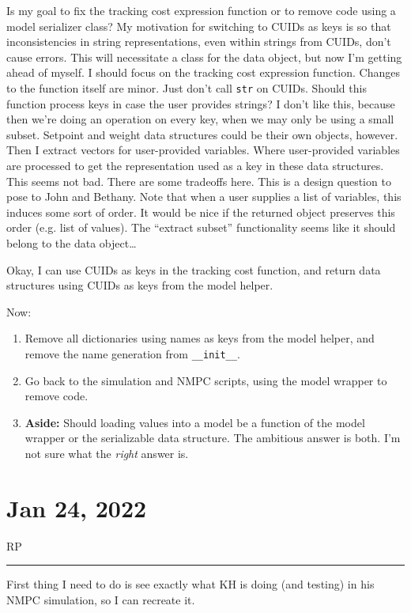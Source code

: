 \documentclass{article}
\newcommand{\RP}{\vspace{0.5cm}RP\vspace{0.2cm}\hrule\vspace{0.2cm}}
\begin{document}
\medskip

Is my goal to fix the tracking cost expression function or to remove code using
a model serializer class?
My motivation for switching to CUIDs as keys is so that inconsistencies in
string representations, even within strings from CUIDs, don't cause errors.
This will necessitate a class for the data object, but now I'm getting ahead
of myself.
I should focus on the tracking cost expression function.
Changes to the function itself are minor. Just don't call \texttt{str} on CUIDs.
Should this function process keys in case the user provides strings?
I don't like this, because then we're doing an operation on every key, when
we may only be using a small subset.
Setpoint and weight data structures could be their own objects, however. Then
I extract vectors for user-provided variables. Where user-provided variables
are processed to get the representation used as a key in these data structures.
This seems not bad. There are some tradeoffs here. This is a design question to
pose to John and Bethany.
Note that when a user supplies a list of variables, this induces some sort of
order. It would be nice if the returned object preserves this order (e.g. list
of values).
The ``extract subset'' functionality seems like it should belong to the data
object\ldots

\medskip

Okay, I can use CUIDs as keys in the tracking cost function, and return
data structures using CUIDs as keys from the model helper.

Now:
\begin{enumerate}
  \item Remove all dictionaries using names as keys from the model helper,
    and remove the name generation from \texttt{\_\_init\_\_}.
  \item Go back to the simulation and NMPC scripts, using the model wrapper
    to remove code.
  \item \textbf{Aside:} Should loading values into a model be a function of the
    model wrapper or the serializable data structure. The ambitious answer is
    both. I'm not sure what the \emph{right} answer is.
\end{enumerate}

\section{Jan 24, 2022}

\RP
First thing I need to do is see exactly what KH is doing (and testing) in his
NMPC simulation, so I can recreate it.
\end{document}
